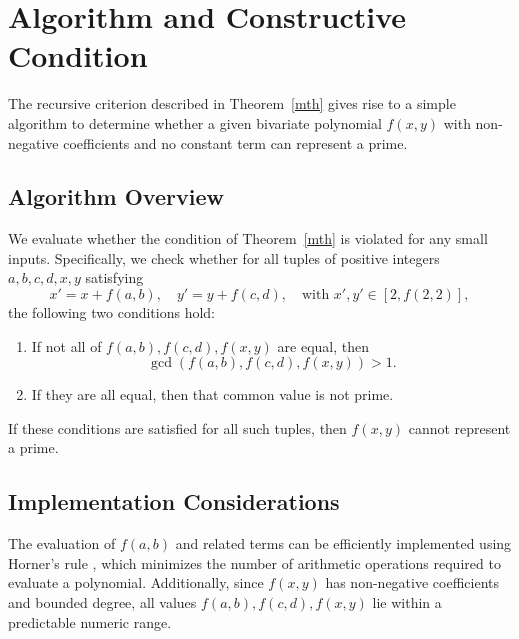 \documentclass[a4paper,11pt]{article}
\begin{document}
	
	\section{Algorithm and Constructive Condition}
	
	The recursive criterion described in Theorem~\ref{mth} gives rise to a simple algorithm to determine whether a given bivariate polynomial $f(x, y)$ with non-negative coefficients and no constant term can represent a prime.
	
	\subsection*{Algorithm Overview}
	
	We evaluate whether the condition of Theorem~\ref{mth} is violated for any small inputs. Specifically, we check whether for all tuples of positive integers $a, b, c, d, x, y$ satisfying
	\[
	x' = x + f(a, b), \quad y' = y + f(c, d), \quad \text{with } x', y' \in [2, f(2,2)],
	\]
	the following two conditions hold:
	\begin{enumerate}
		\item If not all of $f(a,b), f(c,d), f(x,y)$ are equal, then
		\[
		\gcd(f(a,b), f(c,d), f(x,y)) > 1.
		\]
		\item If they are all equal, then that common value is not prime.
	\end{enumerate}
	If these conditions are satisfied for all such tuples, then $f(x, y)$ cannot represent a prime.
	
	\subsection*{Implementation Considerations}
	
	The evaluation of $f(a,b)$ and related terms can be efficiently implemented using Horner’s rule \cite{knuth}, which minimizes the number of arithmetic operations required to evaluate a polynomial. Additionally, since $f(x, y)$ has non-negative coefficients and bounded degree, all values $f(a,b), f(c,d), f(x,y)$ lie within a predictable numeric range.
	
\end{document}
